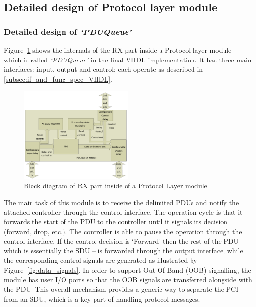 \documentclass[conference]{IEEEtran}
\begin{document}
\subsection{Detailed design of Protocol layer module}

\subsubsection{Detailed design of \emph{`PDUQueue'}}\label{subsubsec:PDUQueue_details}

Figure~\ref{fig:proto_layer_rx_sch} shows the internals of the RX part inside a Protocol layer module -- which is called \emph{`PDUQueue'} in the final VHDL implementation. It has three main interfaces: input, output and control; each operate as described in \ref{subsec:if_and_func_spec_VHDL}.

\begin{figure}[!htb]
    \centering
    \includegraphics[width=0.5\textwidth]{figures_raw/pdu_queue_imp.pdf}
    \caption{Block diagram of RX part inside of a Protocol Layer module}
    \label{fig:proto_layer_rx_sch}
\end{figure}

The main task of this module is to receive the delimited PDUs and notify the attached controller through the control interface. The operation cycle is that it forwards the start of the PDU to the controller until it signals its decision (forward, drop, etc.). The controller is able to pause the operation through the control interface. If the control decision is `Forward' then the rest of the PDU -- which is essentially the SDU -- is forwarded through the output interface, while the corresponding control signals are generated as illustrated by Figure~\ref{fig:data_signals}. In order to support Out-Of-Band (OOB) signalling, the module has user I/O ports so that the OOB signals are transferred alongside with the PDU. This overall mechanism provides a generic way to separate the PCI from an SDU, which is a key part of handling protocol messages.
\end{document}
